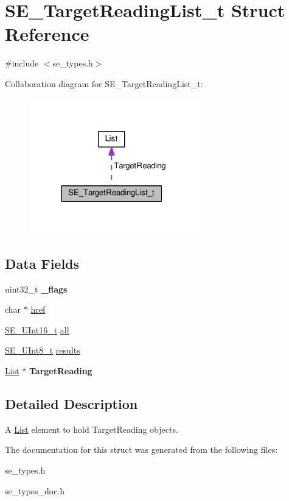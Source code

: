\hypertarget{structSE__TargetReadingList__t}{}\section{S\+E\+\_\+\+Target\+Reading\+List\+\_\+t Struct Reference}
\label{structSE__TargetReadingList__t}


{\ttfamily \#include $<$se\+\_\+types.\+h$>$}



Collaboration diagram for S\+E\+\_\+\+Target\+Reading\+List\+\_\+t\+:\nopagebreak
\begin{figure}[H]
\begin{center}
\leavevmode
\includegraphics[width=209pt]{structSE__TargetReadingList__t__coll__graph}
\end{center}
\end{figure}
\subsection*{Data Fields}
\begin{DoxyCompactItemize}
\item 
uint32\+\_\+t {\bfseries \+\_\+flags}
\item 
char $\ast$ \hyperlink{group__TargetReadingList_gaa952c6e2d7dea9ac53ab0c40f4658651}{href}
\item 
\hyperlink{group__UInt16_gac68d541f189538bfd30cfaa712d20d29}{S\+E\+\_\+\+U\+Int16\+\_\+t} \hyperlink{group__TargetReadingList_gab5798a709fac8c041d53520c7335bdb2}{all}
\item 
\hyperlink{group__UInt8_gaf7c365a1acfe204e3a67c16ed44572f5}{S\+E\+\_\+\+U\+Int8\+\_\+t} \hyperlink{group__TargetReadingList_gae22837c348139e7dceb87e3a95152588}{results}
\item 
\hyperlink{structList}{List} $\ast$ {\bfseries Target\+Reading}
\end{DoxyCompactItemize}


\subsection{Detailed Description}
A \hyperlink{structList}{List} element to hold Target\+Reading objects. 

The documentation for this struct was generated from the following files\+:\begin{DoxyCompactItemize}
\item 
se\+\_\+types.\+h\item 
se\+\_\+types\+\_\+doc.\+h\end{DoxyCompactItemize}

